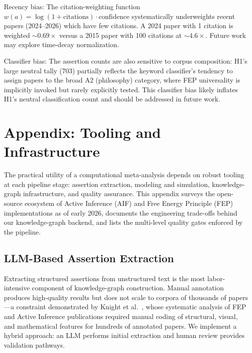 \documentclass[
  english,
]{article}
\begin{document}
{{{{{{{{{{{{{{{{Recency bias: The citation-weighting function
\(w(a) = \log(1+\text{citations})\cdot\text{confidence}\) systematically
underweights recent papers (2024--2026) which have few citations. A 2024
paper with 1 citation is weighted \(\sim0.69\times\) versus a 2015 paper
with 100 citations at \(\sim4.6\times\). Future work may explore
time-decay normalization.

Classifier bias: The assertion counts are also sensitive to corpus
composition: H1's large neutral tally (703) partially reflects the
keyword classifier's tendency to assign papers to the broad A2
(philosophy) category, where FEP universality is implicitly invoked but
rarely explicitly tested. This classifier bias likely inflates H1's
neutral classification count and should be addressed in future work.

\newpage

\section{\texorpdfstring{Appendix: Tooling and Infrastructure
\label{sec:tooling}}{Appendix: Tooling and Infrastructure}}\label{appendix-tooling-and-infrastructure}

The practical utility of a computational meta-analysis depends on robust
tooling at each pipeline stage: assertion extraction, modeling and
simulation, knowledge-graph infrastructure, and quality assurance. This
appendix surveys the open-source ecosystem of Active Inference (AIF) and
Free Energy Principle (FEP) implementations as of early 2026, documents
the engineering trade-offs behind our knowledge-graph backend, and lists
the multi-level quality gates enforced by the pipeline.

\subsection{LLM-Based Assertion
Extraction}\label{llm-based-assertion-extraction-1}

Extracting structured assertions from unstructured text is the most
labor-intensive component of knowledge-graph construction. Manual
annotation produces high-quality results but does not scale to corpora
of thousands of papers---a constraint demonstrated by Knight et
al.~\citep{knight2022fep}, whose systematic analysis of FEP and Active
Inference publications required manual coding of structural, visual, and
mathematical features for hundreds of annotated papers. We implement a
hybrid approach: an LLM performs initial extraction and human review
provides validation pathways.

}}}}}}}}}}}}}}}}
\end{document}
